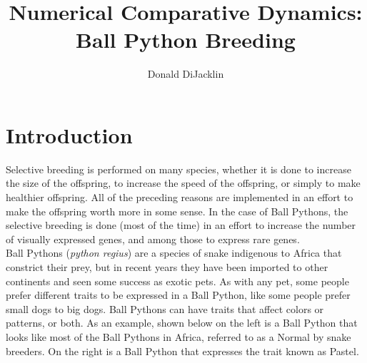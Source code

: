 \documentclass{article}
\begin{document}
\newcommand*{\be}{\mathbb{E}}
\newcommand*{\bv}{\mathbb{V}}
\lstset{showspaces = false, showstringspaces = false}
\linespread{2}
\title{Numerical Comparative Dynamics: Ball Python Breeding}
\author{Donald DiJacklin}
\maketitle

\section*{Introduction}
	\indent\indent Selective breeding is performed on many species, whether it is done to increase the size of the offspring, to increase the speed of the offspring, or simply to make healthier offspring. All of the preceding reasons are implemented in an effort to make the offspring worth more in some sense. In the case of Ball Pythons, the selective breeding is done (most of the time) in an effort to increase the number of visually expressed genes, and among those to express rare genes.\\
	\indent Ball Pythons (\textit{python regius}) are a species of snake indigenous to Africa that constrict their prey, but in recent years they have been imported to other continents and seen some success as exotic pets. As with any pet, some people prefer different traits to be expressed in a Ball Python, like some people prefer small dogs to big dogs. Ball Pythons can have traits that affect colors or patterns, or both. As an example, shown below on the left is a Ball Python that looks like most of the Ball Pythons in Africa, referred to as a Normal by snake breeders. On the right is a Ball Python that expresses the trait known as Pastel.
\end{document}

